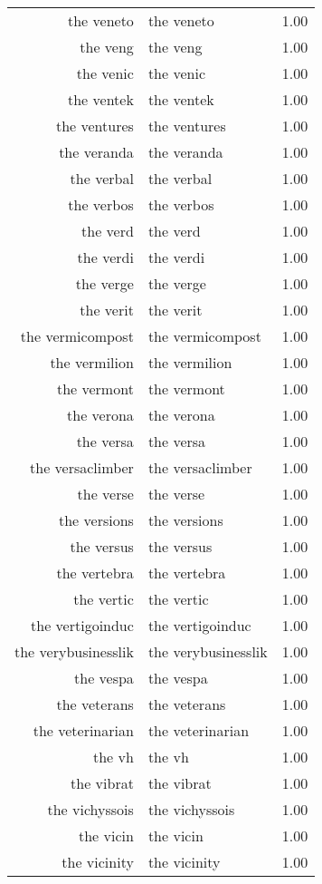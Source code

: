 \begin{table}[ht]
\begin{tabular}{rlr}
  the veneto & the veneto & 1.00 \\ 
  the veng & the veng & 1.00 \\ 
  the venic & the venic & 1.00 \\ 
  the ventek & the ventek & 1.00 \\ 
  the ventures & the ventures & 1.00 \\ 
  the veranda & the veranda & 1.00 \\ 
  the verbal & the verbal & 1.00 \\ 
  the verbos & the verbos & 1.00 \\ 
  the verd & the verd & 1.00 \\ 
  the verdi & the verdi & 1.00 \\ 
  the verge & the verge & 1.00 \\ 
  the verit & the verit & 1.00 \\ 
  the vermicompost & the vermicompost & 1.00 \\ 
  the vermilion & the vermilion & 1.00 \\ 
  the vermont & the vermont & 1.00 \\ 
  the verona & the verona & 1.00 \\ 
  the versa & the versa & 1.00 \\ 
  the versaclimber & the versaclimber & 1.00 \\ 
  the verse & the verse & 1.00 \\ 
  the versions & the versions & 1.00 \\ 
  the versus & the versus & 1.00 \\ 
  the vertebra & the vertebra & 1.00 \\ 
  the vertic & the vertic & 1.00 \\ 
  the vertigoinduc & the vertigoinduc & 1.00 \\ 
  the verybusinesslik & the verybusinesslik & 1.00 \\ 
  the vespa & the vespa & 1.00 \\ 
  the veterans & the veterans & 1.00 \\ 
  the veterinarian & the veterinarian & 1.00 \\ 
  the vh & the vh & 1.00 \\ 
  the vibrat & the vibrat & 1.00 \\ 
  the vichyssois & the vichyssois & 1.00 \\ 
  the vicin & the vicin & 1.00 \\ 
  the vicinity & the vicinity & 1.00 \\ 

\end{tabular}
\end{table}
